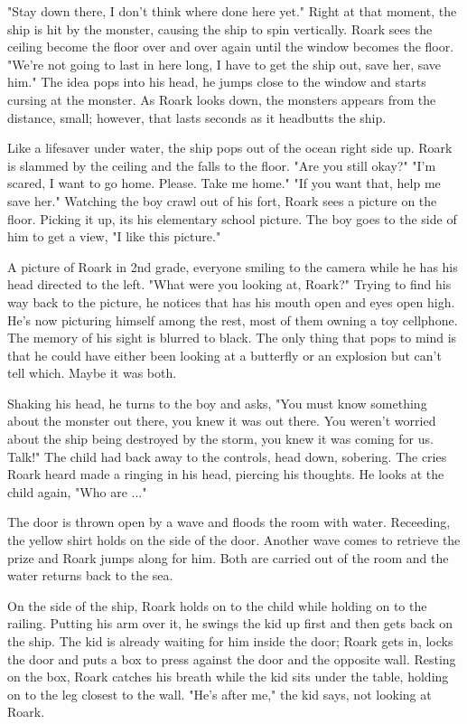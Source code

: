         "Stay down there, I don't think where done here yet." Right at that moment, the ship is hit by the monster, causing the ship to spin
    vertically. Roark sees the ceiling become the floor over and over again until the window becomes the floor. "We're not going to last in
    here long, I have to get the ship out, save her, save him." The idea pops into his head, he jumps close to the window and starts cursing at
    the monster. As Roark looks down, the monsters appears from the distance, small; however, that lasts seconds as it headbutts the ship.

        Like a lifesaver under water, the ship pops out of the ocean right side up. Roark is slammed by the ceiling and the falls to the floor.
    "Are you still okay?"  "I'm scared, I want to go home. Please. Take me home." "If you want that, help me save her." Watching the boy crawl
    out of his fort, Roark sees a picture on the floor. Picking it up, its his elementary school picture. The boy goes to the side of him to
    get a view, "I like this picture."

        A picture of Roark in 2nd grade, everyone smiling to the camera while he has his head directed to the left. "What were you looking at,
    Roark?" Trying to find his way back to the picture, he notices that has his mouth open and eyes open high. He's now picturing himself among
    the rest, most of them owning a toy cellphone. The memory of his sight is blurred to black. The only thing that pops to mind is that he
    could have either been looking at a butterfly or an explosion but can't tell which. Maybe it was both.

        Shaking his head, he turns to the boy and asks, "You must know something about the monster out there, you knew it was out there. You
    weren't worried about the ship being destroyed by the storm, you knew it was coming for us. Talk!" The child had back away to the controls,
    head down, sobering. The cries Roark heard made a ringing in his head, piercing his thoughts. He looks at the child again, "Who are ..."

        The door is thrown open by a wave and floods the room with water. Receeding, the yellow shirt holds on the side of the door. Another wave
    comes to retrieve the prize and Roark jumps along for him. Both are carried out of the room and the water returns back to the sea.

        On the side of the ship, Roark holds on to the child while holding on to the railing. Putting his arm over it, he swings the kid up first
    and then gets back on the ship. The kid is already waiting for him inside the door; Roark gets in, locks the door and puts a box to press 
    against the door and the opposite wall. Resting on the box, Roark catches his breath while the kid sits under the table, holding on to
    the leg closest to the wall. "He's after me," the kid says, not looking at Roark.

